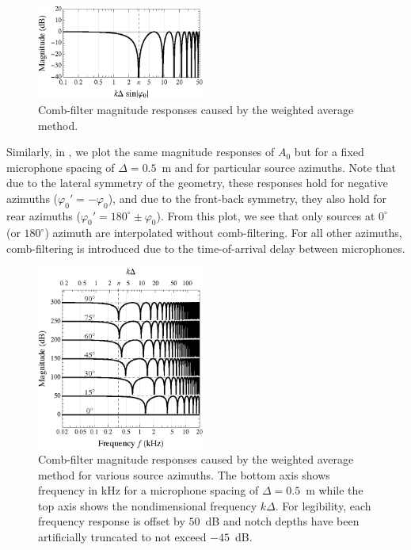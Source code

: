 \begin{figure}[t]
\centering
  \includegraphics[width = 0.49\textwidth]{08_proposed_method/figures/nonDimFreqResp_xf.eps}
  \caption{Comb-filter magnitude responses caused by the weighted average method.}
  \label{fig:08_Proposed_Method:XF_CombFiltering_NonDim}
\end{figure} %

Similarly, in , we plot the same magnitude responses of $A_0$ but for a fixed microphone spacing of $\Delta = 0.5$~m and for particular source azimuths.
Note that due to the lateral symmetry of the geometry, these responses hold for negative azimuths ($\varphi_0' = -\varphi_0$),
and due to the front-back symmetry, they also hold for rear azimuths ($\varphi_0' = 180^\circ \pm \varphi_0$).
From this plot, we see that only sources at $0^\circ$ (or $180^\circ$) azimuth are interpolated without comb-filtering.
For all other azimuths, comb-filtering is introduced due to the time-of-arrival delay between microphones.

\begin{figure}[t]
\centering
  \includegraphics[width = 0.49\textwidth]{08_proposed_method/figures/freqResp_xf.eps}
  \caption[Comb-filter magnitude responses caused by the weighted average method.]{
  Comb-filter magnitude responses caused by the weighted average method for various source azimuths.
  The bottom axis shows frequency in kHz for a microphone spacing of $\Delta = 0.5$~m while the top axis shows the nondimensional frequency $k\Delta$.
  For legibility, each frequency response is offset by $50$~dB and notch depths have been artificially truncated to not exceed $-45$~dB.}
  \label{fig:08_Proposed_Method:XF_CombFiltering}
\end{figure} %

